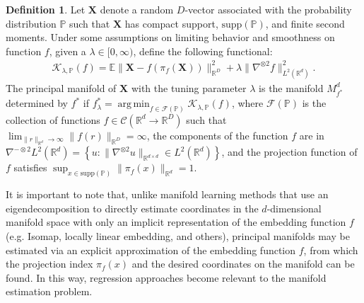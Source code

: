 \documentclass[12pt]{article}
\DeclareMathOperator*{\argmin}{arg\,min}
\theoremstyle{definition}
\newtheorem{definition}{Definition}
\begin{document}
\begin{definition}
  \label{def:principal_manifolds}
  Let $\mathbf{X}$ denote a random $D$-vector associated with the probability distribution $\mathbb{P}$ such that $\mathbf{X}$ has compact support, $\text{supp}(\mathbb{P})$, and finite second moments. Under some assumptions on limiting behavior and smoothness on function $f$, given a $\lambda \in [0, \infty)$, define the following functional:
  \begin{align}\label{eq:pme_kappa}
\mathcal{K}_{\lambda, \mathbb{P}}(f) = \mathbb{E}\|\mathbf{X} - f(\pi_f(\mathbf{X}))\|_{\mathbb{R}^{D}}^2 + \lambda\|\nabla^{\otimes 2}f\|_{L^2(\mathbb{R}^{d})}^2. 
  \end{align}
  The principal manifold of $\mathbf{X}$ with the tuning parameter $\lambda$ is the manifold $M_{f^{*}}^{d}$ determined by $f^{*}$ if
  $f_{\lambda}^{*} = \argmin_{f \in \mathcal{F}(\mathbb{P})}\mathcal{K}_{\lambda, \mathbb{P}}(f)$,
where $\mathcal{F}(\mathbb{P})$ is the collection of functions $f \in \mathcal{C}(\mathbb{R}^{d} \to \mathbb{R}^{D})$ such that $\lim_{\|r\|_{\mathbb{R}^{d}} \to \infty}\|f(r)\|_{\mathbb{R}^{D}} = \infty$, the components of the function $f$ are in $\nabla^{-\otimes 2}L^2(\mathbb{R}^{d}) = \left\{u : \|\nabla^{\otimes 2} u\|_{\mathbb{R}^{d \times d}} \in L^2(\mathbb{R}^{d})\right\}$, and the projection function of $f$ satisfies $\sup_{x \in \text{supp}(\mathbb{P})}\|\pi_f(x)\|_{\mathbb{R}^{d}} = 1$.
\end{definition}

It is important to note that, unlike manifold learning methods that use an eigendecomposition to directly estimate coordinates in the $d$-dimensional manifold space with only an implicit representation of the embedding function $f$ (e.g. Isomap, locally linear embedding, and others), principal manifolds may be estimated via an explicit approximation of the embedding function $f$, from which the projection index $\pi_f(x)$ and the desired coordinates on the manifold can be found. In this way, regression approaches become relevant to the manifold estimation problem.
\end{document}
